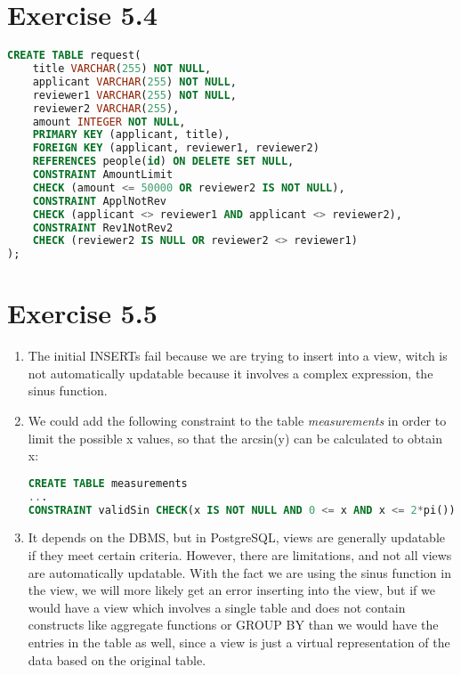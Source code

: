 \documentclass{article} %
\newcommand{\homeworkNumber}{5}
\begin{document}
\section*{Exercise \homeworkNumber.4}

\begin{lstlisting}[language=SQL, tabsize=4]
CREATE TABLE request(
	title VARCHAR(255) NOT NULL,
	applicant VARCHAR(255) NOT NULL,
	reviewer1 VARCHAR(255) NOT NULL,
	reviewer2 VARCHAR(255),
	amount INTEGER NOT NULL,
	PRIMARY KEY (applicant, title),
	FOREIGN KEY (applicant, reviewer1, reviewer2)
	REFERENCES people(id) ON DELETE SET NULL,
	CONSTRAINT AmountLimit
	CHECK (amount <= 50000 OR reviewer2 IS NOT NULL),
	CONSTRAINT ApplNotRev
	CHECK (applicant <> reviewer1 AND applicant <> reviewer2),
	CONSTRAINT Rev1NotRev2
	CHECK (reviewer2 IS NULL OR reviewer2 <> reviewer1)
);
\end{lstlisting}

\section*{Exercise \homeworkNumber.5}

\begin{enumerate}[(1)]
\item The initial INSERTs fail because we are trying to insert into a view, witch is not automatically updatable because it involves a complex expression, the sinus function.

\item We could add the following constraint to the table \textit{measurements} in order to limit the possible x values, so that the arcsin(y) can be calculated to obtain x:
\begin{lstlisting}[language=SQL, tabsize=4]
CREATE TABLE measurements
...
CONSTRAINT validSin CHECK(x IS NOT NULL AND 0 <= x AND x <= 2*pi())
\end{lstlisting}

\item It depends on the DBMS, but in PostgreSQL, views are generally updatable if they meet certain criteria. However, there are limitations, and not all views are automatically updatable. With the fact we are using the sinus function in the view, we will more likely get an error inserting into the view, but if we would have a view which involves a single table and does not contain constructs like aggregate functions or GROUP BY than we would have the entries in the table as well, since a view is just a virtual representation of the data based on the original table.
\end{enumerate}
\end{document}
